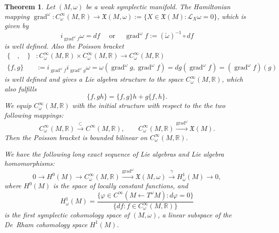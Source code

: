 \documentclass[12pt]{amsart}
\newtheorem{theorem}{Theorem}[section]
\theoremstyle{definition}
\def\ga{\gamma}
\def\ph{\varphi}
\def\om{\omega}
\def\o{\operatorname{\circ}}
\def\i{^{-1}}
\def\x{\times}
\def\X{{\mathfrak X}}
\def\L{\mathcal{L}}
\let\on=\operatorname
\begin{document}
\begin{theorem} \label{app:thm}
Let $(M,\om)$ be a weak symplectic manifold. 
The Hamiltonian mapping 
$\on{grad}^\om :C^\infty_\om (M,\mathbb R) \to  \X(M,\om) :=\{X\in \X(M):\L_X\om =0 \}$, which is given by
\begin{displaymath}
i_{\on{grad}^\om f}\om=df\quad\text{ or }\quad 
     \on{grad}^\om f:= (\check\om)\i\o df
\end{displaymath}
is well defined. Also the Poisson bracket 
\begin{align*}
\{\quad,\quad\}&: C^\infty_\om (M,\mathbb R) \x
C^\infty_\om (M,\mathbb R) \to C^\infty_\om (M,\mathbb R)
\\
\{f,g\}&:= i_{\on{grad}^\om f}i_{\on{grad}^\om g}\om = 
     \om(\on{grad}^\om g,\on{grad}^\om f) = 
dg(\on{grad}^\om f) = (\on{grad}^\om f)(g) 
\end{align*}is well defined and gives a Lie algebra structure to
the space $C^\infty_\om (M,\mathbb R)$, which also fulfills
\begin{displaymath}
\{f,gh\}=\{f,g\}h+g\{f,h\}.
\end{displaymath}
We equip $C^\infty_\om(M,\mathbb R)$ with the initial structure 
with respect to the the two following mappings:
$$
C^\infty_\om(M,\mathbb R) \xrightarrow{\subset} C^\infty(M,\mathbb R),\qquad
C^\infty_\om(M,\mathbb R) \xrightarrow{\on{grad}^\om} \X(M).
$$
Then the Poisson bracket is bounded bilinear on $C^\infty_\om(M,\mathbb R)$. 

We have the following long exact sequence of Lie algebras
and Lie algebra homomorphisms:
\begin{displaymath}
0\to  H^0(M)\to C^\infty_\om (M,\mathbb R)  
     \xrightarrow{{\on{grad}^\om}}\X(M,\om) \xrightarrow{\ga} H^1_\om(M) \to 0,
\end{displaymath}
where $H^0(M)$ is the space of locally constant functions, and 
\begin{displaymath}
H^1_\om(M)=\frac{\{\ph\in C^\infty(M\gets T^\om M):d\ph=0\}}
     {\{df:f\in C^\infty_\om(M,\mathbb R)\}}
\end{displaymath}
is the first symplectic cohomology space of $(M,\om)$, a linear 
subspace of the De~Rham cohomology space $H^1(M)$.
\end{theorem}
\end{document}
